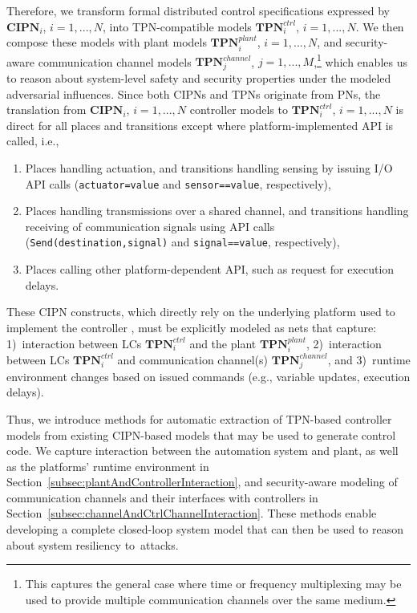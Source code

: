 Therefore, we transform formal distributed control specifications expressed by $\mathbf{CIPN}_i$, $i=1,...,N$, into TPN-compatible models $\mathbf{TPN}_i^{ctrl}$, $i=1,...,N$. We then compose these models with plant models $\mathbf{TPN}_i^{plant}$, $i=1,...,N$, and security-aware communication channel models $\mathbf{TPN}_j^{channel}$, $j=1,...,M$,\footnote{This captures the general case where time or frequency multiplexing may be used to provide multiple communication channels over the same medium.} which enables us to reason about system-level safety and security properties under the modeled adversarial influences. Since both CIPNs and TPNs originate from PNs, the translation from $\mathbf{CIPN}_i$, $i=1,...,N$ controller models to $\mathbf{TPN}_i^{ctrl}$, $i=1,...,N$ is direct for all places and transitions except where platform-implemented API is called,  i.e., %
\begin{enumerate}
  \item Places handling actuation, and transitions handling sensing by issuing I/O API calls %
  (\verb!actuator=value! and \verb!sensor==value!, respectively),
  \item Places handling transmissions over a shared channel, and transitions handling receiving of communication signals %
  using API calls (\verb!Send(destination,signal)! and \verb!signal==value!, respectively),
  \item Places calling other platform-dependent API, such as request for execution delays.
\end{enumerate}
%
These CIPN constructs, which directly rely on the underlying platform used to implement the controller , %
must be explicitly modeled as nets that capture: 1)~interaction between LCs $\mathbf{TPN}_i^{ctrl}$ and the plant $\mathbf{TPN}_i^{plant}$, 2)~interaction between LCs $\mathbf{TPN}_i^{ctrl}$ and communication channel(s) $\mathbf{TPN}_j^{channel}$, and 3)~runtime environment %
changes based on issued commands (e.g., variable updates, execution delays).

Thus, we introduce methods for automatic extraction of TPN-based controller models from existing CIPN-based models that may be used to generate control code. We capture interaction between the automation system and plant, as well as the platforms' runtime environment in Section~\ref{subsec:plantAndControllerInteraction}, %
and security-aware modeling of communication channels and their interfaces with controllers in Section~\ref{subsec:channelAndCtrlChannelInteraction}. These methods enable developing a complete closed-loop system model that can then be used to reason about system resiliency to~attacks.

